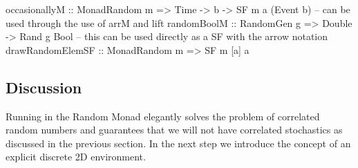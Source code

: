 \begin{HaskellCode}
occasionallyM :: MonadRandom m => Time -> b -> SF m a (Event b)
-- can be used through the use of arrM and lift
randomBoolM :: RandomGen g => Double -> Rand g Bool
-- this can be used directly as a SF with the arrow notation
drawRandomElemSF :: MonadRandom m => SF m [a] a
\end{HaskellCode}

\subsection{Discussion} 
Running in the Random Monad elegantly solves the problem of correlated random numbers and guarantees that we will not have correlated stochastics as discussed in the previous section. In the next step we introduce the concept of an explicit discrete 2D environment.